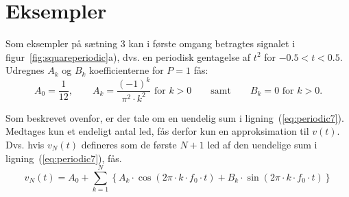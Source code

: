 \documentclass[11pt,a4paper]{article}
\begin{document}
\vspace{\baselineskip}

\section{Eksempler}
Som eksempler på sætning 3 kan i første omgang betragtes signalet i figur~\ref{fig:squareperiodic}a), dvs. en periodisk gentagelse af $t^2$ for $-0.5<t<0.5$. Udregnes $A_k$ og $B_k$ koefficienterne for $P=1$ fås:
\begin{equation}
A_{0} = \frac{1}{12},\qquad{}A_{k} = \frac{(-1)^{k}}{\pi^{2}\cdot{}k^{2}}\textrm{ for }k>0\qquad{}\textrm{samt}\qquad{}B_{k} = 0\textrm{ for }k>{}0.
\end{equation}

\noindent{}Som beskrevet ovenfor, er der tale om en uendelig sum i ligning~(\ref{eq:periodic7}). Medtages kun et endeligt antal led, fås derfor kun en approksimation til $v(t)$. Dvs. hvis $v_{N}(t)$ defineres som de første $N+1$ led af den uendelige sum i ligning~(\ref{eq:periodic7}), fås.
\begin{equation}
v_{N}(t) = A_0 + \sum_{k=1}^{N} \left\lbrace{}A_{k}\cdot\cos(2\pi\cdot{}k\cdot{}f_{0}\cdot{}t)+B_{k}\cdot\sin(2\pi\cdot{}k\cdot{}f_{0}\cdot{}t)\right\rbrace
\end{equation}
\end{document}
